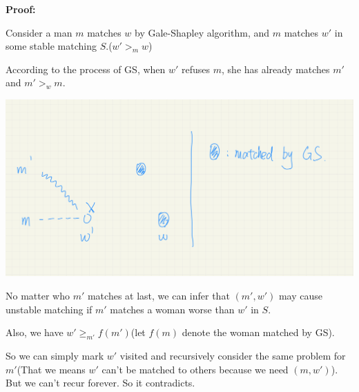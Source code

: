 \documentclass[12 pt]{article}
\begin{document}
\textbf{Proof: } 

Consider a man $m$ matches $w$ by Gale-Shapley algorithm, and $m$ matches $w'$ in some stable matching $S$.($w' >_m w$)

According to the process of GS, when $w'$ refuses $m$, she has already matches $m'$ and $m' >_w m$.

\includegraphics[width=\linewidth]{P9_1.jpeg}

No matter who $m'$ matches at last, we can infer that $(m', w')$ may cause unstable matching if $m'$ matches a woman worse than $w'$ in $S$.

Also, we have $w' \ge_{m'} f(m')$(let $f(m)$ denote the woman matched by GS).

So we can simply mark $w'$ visited and recursively consider the same problem for $m'$(That we means $w'$ can't be matched to others because we need $(m, w')$). But we can't recur forever. So it contradicts.
\end{document}
